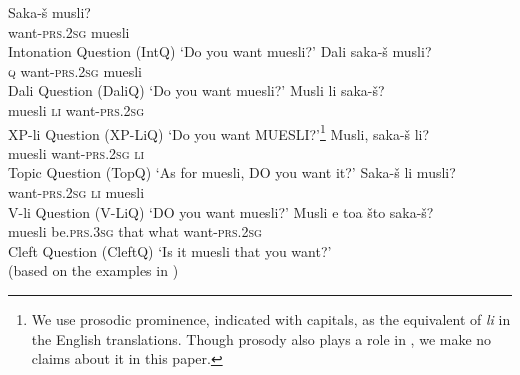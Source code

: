 \documentclass[output=paper,
colorlinks,
citecolor=brown,
newtxmath
]{langscibook}
\begin{document}

\ea
    \ea \gll Saka-š musli? \\
want-\textsc{prs.2sg} muesli \\ \hfill Intonation Question (IntQ) \label{intonation}
\glt  `Do you want muesli?' \label{intoq}
    \ex \gll Dali saka-š musli? \\
\textsc{q} want-\textsc{prs.2sg} muesli \\ \hfill Dali Question (DaliQ)
\glt `Do you want muesli?'  \label{dali}
    \ex \gll Musli li saka-š? \\
muesli \textsc{li} want-\textsc{prs.2sg} \\ \hfill XP-li Question (XP-LiQ)  \label{li}
\glt `Do you want MUESLI?'\footnote{We use prosodic prominence, indicated with capitals, as the equivalent of \textit{li} in the English translations. Though prosody also plays a role in , we make no claims about it in this paper.}
    \ex \gll Musli, saka-š li? \\
muesli want-\textsc{prs.2sg} \textsc{li} \\ \hfill Topic Question (TopQ)
\glt `As for muesli, DO you want it?'\label{topli}
    \ex \gll Saka-š li musli? \\
want-\textsc{prs.2sg} \textsc{li} muesli \\ \hfill V-li Question (V-LiQ)
\glt `DO you want muesli?' \label{vli}
    \ex \gll Musli e toa što saka-š? \\
muesli be.\textsc{prs.3sg} that what want-\textsc{prs.2sg} \\ \hfill Cleft Question (CleftQ)
\glt `Is it muesli that you want?'\\ \label{cleft} \hfill (based on the examples in \citealt[579]{Rudin.Kramer.Billings.Baerman1999})
\z\z \label{bigli}
\end{document}
